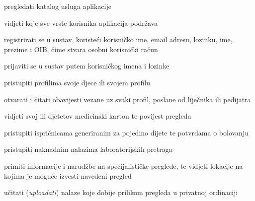 			
			\begin{packed_enum}
				\item  {}
				
				\begin{packed_enum}
					
					\item pregledati katalog usluga aplikacije
					\item vidjeti koje sve vrste korisnika aplikacija podržava
					\item registrirati se u sustav, koristeći korisničko ime, email adresu, lozinku, ime, prezime i OIB, čime stvara osobni korisnički račun
					\item prijaviti se u sustav putem korisničkog imena i lozinke
					
				\end{packed_enum}
			
				\item  {}
				
				\begin{packed_enum}
					
					\item pristupiti profilima svoje djece ili svojem profilu
					\item otvarati i čitati obavijesti vezane uz svaki profil, poslane od liječnika ili pedijatra
					\item vidjeti svoj ili djetetov medicinski karton te povijest pregleda
					\item pristupiti ispričnicama generiranim za pojedino dijete te potvrdama o bolovanju
					\item pristupiti naknadnim nalazima laboratorijskih pretraga
					\item primiti informacije i narudžbe na specijalističke preglede, te vidjeti lokacije na kojima je moguće izvesti navedeni pregled
					\item učitati (\textit{uploadati}) nalaze koje dobije prilikom pregleda u privatnoj ordinaciji
					
				\end{packed_enum}
				
				\item  {}
				
				\begin{packed_enum}
					

\end{packed_enum}
\end{packed_enum}

